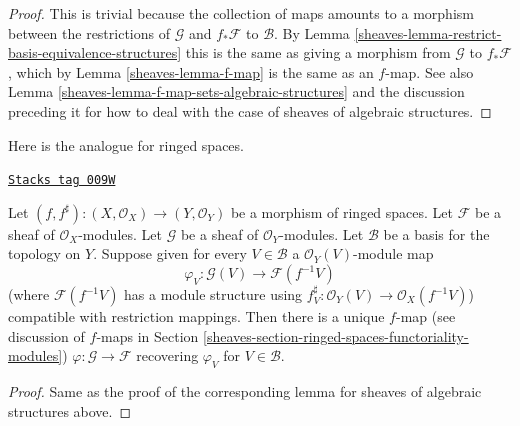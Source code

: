 \begin{proof}

This is trivial because the collection of maps
amounts to a morphism between the restrictions
of $\mathcal{G}$ and $f_*\mathcal{F}$ to $\mathcal{B}$.
By Lemma \ref{sheaves-lemma-restrict-basis-equivalence-structures}
this is the same as giving a morphism from $\mathcal{G}$
to $f_*\mathcal{F}$, which by Lemma \ref{sheaves-lemma-f-map}
is the same as an $f$-map. See also
Lemma \ref{sheaves-lemma-f-map-sets-algebraic-structures}
and the discussion preceding it
for how to deal with the case of sheaves of algebraic structures.
\end{proof}

Here is the analogue for ringed spaces.

\begin{lemma}
\label{sheaves-lemma-f-map-basis-below-modules}
\href{https://stacks.math.columbia.edu/tag/009W}{\texttt{Stacks tag 009W}}

Let $(f, f^\sharp) : (X, \mathcal{O}_X) \to (Y, \mathcal{O}_Y)$
be a morphism of ringed spaces.
Let $\mathcal{F}$ be a sheaf of $\mathcal{O}_X$-modules.
Let $\mathcal{G}$ be a sheaf of $\mathcal{O}_Y$-modules.
Let $\mathcal{B}$ be a basis for the topology on $Y$.
Suppose given for every $V \in \mathcal{B}$ a
$\mathcal{O}_Y(V)$-module map
$$
\varphi_V :
\mathcal{G}(V)
\longrightarrow
\mathcal{F}(f^{-1}V)
$$
(where $\mathcal{F}(f^{-1}V)$ has a module structure using
$f^\sharp_V : \mathcal{O}_Y(V) \to \mathcal{O}_X(f^{-1}V)$)
compatible with restriction mappings.
Then there is a unique $f$-map (see discussion of $f$-maps in
Section \ref{sheaves-section-ringed-spaces-functoriality-modules})
$\varphi : \mathcal{G} \to \mathcal{F}$
recovering $\varphi_V$ for $V \in \mathcal{B}$.
\end{lemma}

\begin{proof}
Same as the proof of the corresponding lemma
for sheaves of algebraic structures above.
\end{proof}

